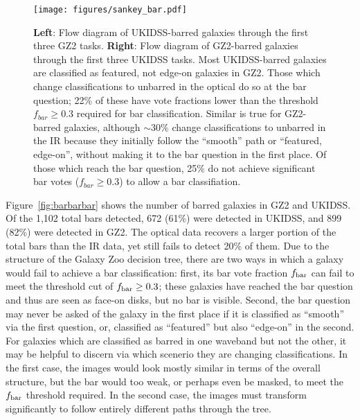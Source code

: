 \begin{figure}
\centering
\texttt{[image: figures/sankey\_bar.pdf]}
\caption{\textbf{Left}: Flow diagram of UKIDSS-barred galaxies through the first three GZ2 tasks. \textbf{Right}: Flow diagram of GZ2-barred galaxies through the first three UKIDSS tasks. Most UKIDSS-barred galaxies are classified as featured, not edge-on galaxies in GZ2. Those which change classifications to unbarred in the optical do so at the bar question; 22\% of these have vote fractions lower than the threshold $f_{bar}\ge0.3$ required for bar classification.  Similar is true for GZ2-barred galaxies, although $\sim30\%$ change classifications to unbarred in the IR because they initially follow the ``smooth'' path or ``featured, edge-on'', without making it to the bar question in the first place. Of those which reach the bar question, 25\% do not achieve significant bar votes ($f_{bar}\ge0.3$) to allow a bar classifiation.  }
\label{fig:sankeybar}
\end{figure}

Figure~\ref{fig:barbarbar} shows the number of barred galaxies in GZ2 and UKIDSS. Of the 1,102 total bars detected, 672 (61\%) were detected in UKIDSS, and 899 (82\%) were detected in GZ2. The optical data recovers a larger portion of the total bars than the IR data, yet still fails to detect 20\% of them. Due to the structure of the Galaxy Zoo decision tree, there are two ways in which a galaxy would fail to achieve a bar classification: first, its bar vote fraction $f_{\rm bar}$ can fail to meet the threshold cut of $f_{\rm bar}\ge0.3$; these galaxies have reached the bar question and thus are seen as face-on disks, but no bar is visible. Second, the bar question may never be asked of the galaxy in the first place if it is classified as ``smooth'' via the first question, or, classified as ``featured'' but also ``edge-on'' in the second. For galaxies which are classified as barred in one waveband but not the other, it may be helpful to discern via which scenerio they are changing classifications. In the first case, the images would look mostly similar in terms of the overall structure, but the bar would too weak, or perhaps even be masked, to meet the $f_{\rm bar}$ threshold required. In the second case, the images must transform significantly to follow entirely different paths through the tree. 

